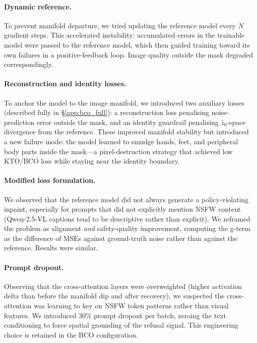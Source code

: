 \paragraph{Dynamic reference.}
To prevent manifold departure, we tried updating the reference model every
$N$ gradient steps.
This accelerated instability: accumulated errors in the trainable model
were passed to the reference model, which then guided training toward its
own failures in a positive-feedback loop.
Image quality outside the mask degraded correspondingly.

\paragraph{Reconstruction and identity losses.}
To anchor the model to the image manifold, we introduced two auxiliary
losses (described fully in \S\ref{app:bco_full}):
a reconstruction loss penalising noise-prediction error outside the mask,
and an identity guardrail penalising $\hat{z}_0$-space divergence from the
reference.
These improved manifold stability but introduced a new failure mode: the
model learned to smudge hands, feet, and peripheral body parts inside the
mask---a pixel-destruction strategy that achieved low KTO/BCO loss while
staying near the identity boundary.

\paragraph{Modified loss formulation.}
We observed that the reference model did not always generate a
policy-violating inpaint, especially for prompts that did not explicitly
mention NSFW content (Qwen-2.5-VL captions tend to be descriptive rather
than explicit).
We reframed the problem as alignment \emph{and} safety-quality improvement,
computing the g-term as the difference of MSEs against ground-truth noise
rather than against the reference.
Results were similar.

\paragraph{Prompt dropout.}
Observing that the cross-attention layers were overweighted (higher
activation delta than before the manifold dip and after recovery), we
suspected the cross-attention was learning to key on NSFW token patterns
rather than visual features.
We introduced 30\% prompt dropout per batch, zeroing the text conditioning
to force spatial grounding of the refusal signal.
This engineering choice is retained in the BCO configuration.

